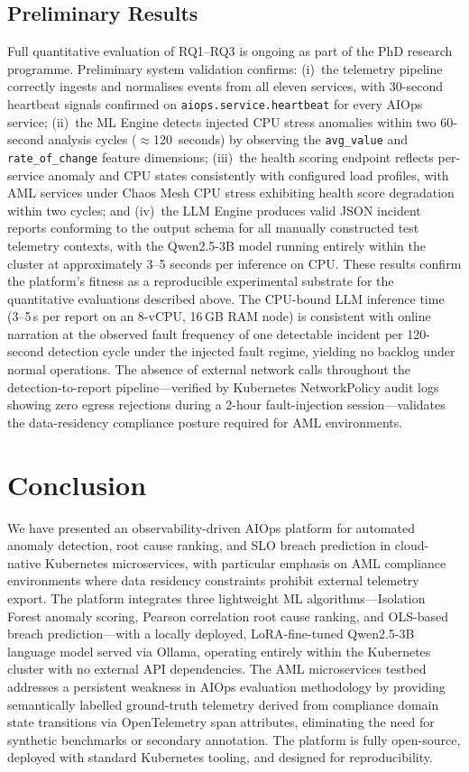 \documentclass[a4paper,anonymous,UKenglish]{lipics-v2021}
\begin{document}
\subsection{Preliminary Results}

Full quantitative evaluation of RQ1--RQ3 is ongoing as part of the PhD research
programme. Preliminary system validation confirms: (i)~the telemetry pipeline
correctly ingests and normalises events from all eleven services, with
30-second heartbeat signals confirmed on \texttt{aiops.service.heartbeat} for
every AIOps service; (ii)~the ML Engine detects injected CPU stress anomalies
within two 60-second analysis cycles ($\approx$120~seconds) by observing the
\texttt{avg\_value} and \texttt{rate\_of\_change} feature dimensions;
(iii)~the health scoring endpoint reflects per-service anomaly and CPU states
consistently with configured load profiles, with AML services under Chaos Mesh
CPU stress exhibiting health score degradation within two cycles; and (iv)~the
LLM Engine produces valid JSON incident reports conforming to the output schema
for all manually constructed test telemetry contexts, with the Qwen2.5-3B model
running entirely within the cluster at approximately 3--5 seconds per inference
on CPU. These results confirm the platform's fitness as a reproducible
experimental substrate for the quantitative evaluations described above. The
CPU-bound LLM inference time (3--5\,s per report on an 8-vCPU, 16\,GB RAM
node) is consistent with online narration at the observed fault frequency of one
detectable incident per 120-second detection cycle under the injected fault
regime, yielding no backlog under normal operations. The absence of external
network calls throughout the detection-to-report pipeline---verified by
Kubernetes NetworkPolicy audit logs showing zero egress rejections during a
2-hour fault-injection session---validates the data-residency compliance
posture required for AML environments.

\section{Conclusion}
\label{sec:conclusion}

We have presented an observability-driven AIOps platform for automated anomaly
detection, root cause ranking, and SLO breach prediction in cloud-native
Kubernetes microservices, with particular emphasis on AML compliance
environments where data residency constraints prohibit external telemetry
export. The platform integrates three lightweight ML
algorithms---Isolation Forest anomaly scoring, Pearson correlation root cause
ranking, and OLS-based breach prediction---with a locally deployed, LoRA-fine-tuned
Qwen2.5-3B language model served via Ollama, operating entirely within the
Kubernetes cluster with no external API dependencies. The AML microservices
testbed addresses a persistent weakness in AIOps evaluation methodology by
providing semantically labelled ground-truth telemetry derived from compliance
domain state transitions via OpenTelemetry span attributes, eliminating the
need for synthetic benchmarks or secondary annotation. The platform is fully
open-source, deployed with standard Kubernetes tooling, and designed for
reproducibility.
\end{document}
